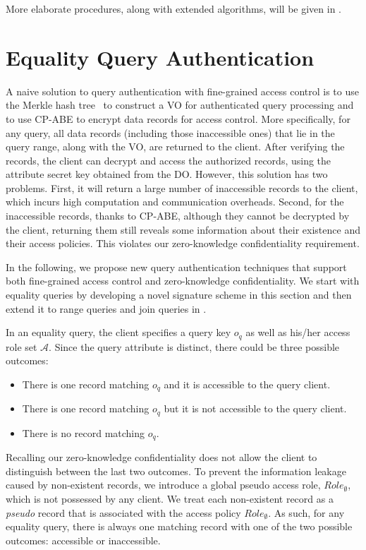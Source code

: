 More elaborate procedures, along with extended algorithms, will be given in .

\section{Equality Query Authentication}\label{sec:access-control:equality-query}

A naive solution to query authentication with fine-grained access control is to use the Merkle hash tree~\cite{10.1007/0-387-34805-0_21} to construct a VO for authenticated query processing and to use CP-ABE to encrypt data records for access control. More specifically, for any query, all data records (including those inaccessible ones) that lie in the query range, along with the VO, are returned to the client. After verifying the records, the client can decrypt and access the authorized records, using the attribute secret key obtained from the DO\@. However, this solution has two problems. First, it will return a large number of inaccessible  records to the client, which incurs high computation and communication overheads. Second, for the inaccessible records, thanks to CP-ABE, although they cannot be decrypted by the client,  returning them still reveals some information about their existence and their access policies. This violates our zero-knowledge confidentiality requirement.

In the following, we propose new query authentication techniques that support both fine-grained access control and zero-knowledge confidentiality. We start with equality queries by developing a novel signature scheme in this section and then extend it to range queries and join queries in .

In an equality query, the client specifies a query key $o_q$ as well as his/her access role set $\mathcal{A}$. Since the query attribute is distinct, there could be three possible outcomes:
\begin{itemize}
  \item There is one record matching $o_q$ and it is accessible to the query client.
  \item There is one record matching $o_q$ but it is not accessible to the query client.
  \item There is no record matching $o_q$.
\end{itemize}

Recalling our zero-knowledge confidentiality does not allow the client to distinguish between the last two outcomes. To prevent the information leakage caused by non-existent records, we introduce a global pseudo access role, ${Role}_{\emptyset}$, which is not possessed by any client. We treat each non-existent record as a \emph{pseudo}  record that is associated with the access policy ${Role}_{\emptyset}$. As such, for any equality query, there is always one matching record with one of the two possible outcomes: accessible or inaccessible.

